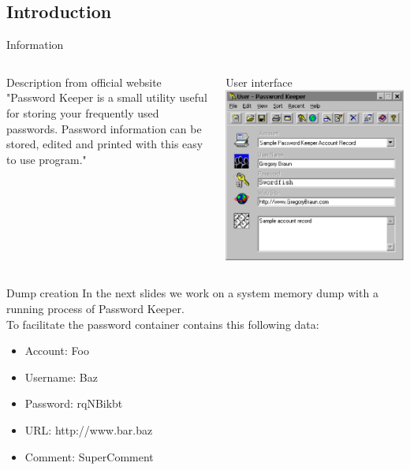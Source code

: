 \documentclass[compress]{beamer}
\begin{document}
\subsection{Introduction}
\begin{frame}{Information}
  \begin{columns}[T]
    \begin{column}{.5\textwidth}
      \begin{block}{Description from official website}
"Password Keeper is a small utility
useful for storing your frequently
used passwords. Password
information can be stored,
edited and printed with this easy
to use program."\\
      \end{block}
    \end{column}
    \begin{column}{.5\textwidth}
      \begin{block}{User interface}
        \includegraphics[width=\textwidth]{img/passwordkeepergui.eps}
      \end{block}
    \end{column}
  \end{columns}
\end{frame}

\begin{frame}{Dump creation}
In the next slides we work on a system memory dump with a running 
process of Password Keeper. \\
\vspace{0.2in}
To facilitate the password container
contains this following data:
  \begin{itemize}
    \item Account: Foo
    \item Username: Baz
    \item Password: rqNBikbt
    \item URL: http://www.bar.baz
    \item Comment: SuperComment
  \end{itemize}
\end{frame}
\end{document}
